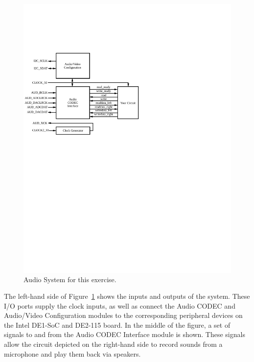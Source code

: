 \documentclass[epsfig,10pt,fullpage]{article}
\begin{document}
\begin{figure}[H]
\centering
\includegraphics{figures/audio_system.pdf}
\caption{Audio System for this exercise.}
\label{fig:audio_system}
\end{figure}

The left-hand side of Figure~\ref{fig:audio_system} shows the inputs and outputs of the system. These I/O ports
supply the clock inputs, as well as connect the {\sf Audio CODEC} and {\sf Audio/Video Configuration} modules to the corresponding
peripheral devices on the Intel DE1-SoC and DE2-115 board. In the middle of the figure, a set 
of signals to and from the {\sf Audio CODEC Interface} module is shown. These signals 
allow the circuit depicted on the right-hand side to record sounds from a microphone and 
play them back via speakers.
\end{document}

